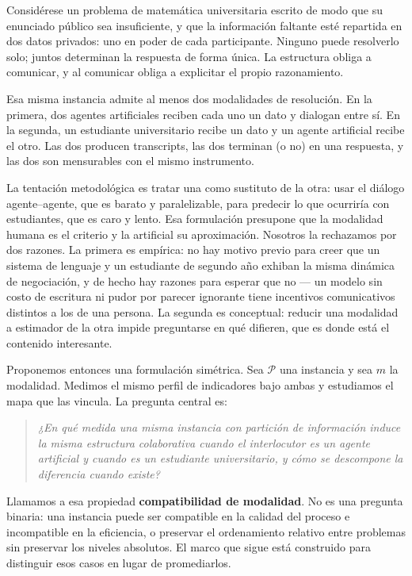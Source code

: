 \documentclass[11pt,a4paper]{article}
\theoremstyle{definition}
\theoremstyle{plain}
\theoremstyle{remark}
\begin{document}
Considérese un problema de matemática universitaria escrito de modo que su
enunciado público sea insuficiente, y que la información faltante esté repartida
en dos datos privados: uno en poder de cada participante. Ninguno puede resolverlo
solo; juntos determinan la respuesta de forma única. La estructura obliga a
comunicar, y al comunicar obliga a explicitar el propio razonamiento.

Esa misma instancia admite al menos dos modalidades de resolución. En la primera,
dos agentes artificiales reciben cada uno un dato y dialogan entre sí. En la
segunda, un estudiante universitario recibe un dato y un agente artificial recibe
el otro. Las dos producen transcripts, las dos terminan (o no) en una respuesta, y
las dos son mensurables con el mismo instrumento.

La tentación metodológica es tratar una como sustituto de la otra: usar el diálogo
agente--agente, que es barato y paralelizable, para predecir lo que ocurriría con
estudiantes, que es caro y lento. Esa formulación presupone que la modalidad
humana es el criterio y la artificial su aproximación. Nosotros la rechazamos por
dos razones. La primera es empírica: no hay motivo previo para creer que un
sistema de lenguaje y un estudiante de segundo año exhiban la misma dinámica de
negociación, y de hecho hay razones para esperar que no --- un modelo sin costo
de escritura ni pudor por parecer ignorante tiene incentivos comunicativos
distintos a los de una persona. La segunda es conceptual: reducir una modalidad a
estimador de la otra impide preguntarse en qué difieren, que es donde está el
contenido interesante.

Proponemos entonces una formulación simétrica. Sea $\mathcal{P}$ una instancia y
sea $m$ la modalidad. Medimos el mismo perfil de indicadores bajo ambas y
estudiamos el mapa que las vincula. La pregunta central es:

\begin{quote}
\emph{¿En qué medida una misma instancia con partición de información induce la
misma estructura colaborativa cuando el interlocutor es un agente artificial y
cuando es un estudiante universitario, y cómo se descompone la diferencia cuando
existe?}
\end{quote}

Llamamos a esa propiedad \textbf{compatibilidad de modalidad}. No es una
pregunta binaria: una instancia puede ser compatible en la calidad del proceso e
incompatible en la eficiencia, o preservar el ordenamiento relativo entre
problemas sin preservar los niveles absolutos. El marco que sigue está construido
para distinguir esos casos en lugar de promediarlos.
\end{document}
